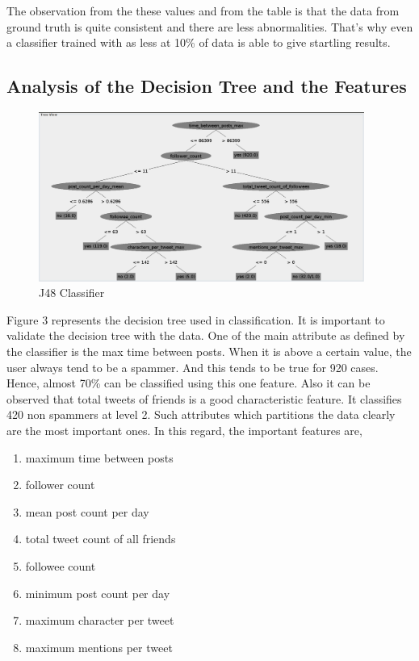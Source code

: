\documentclass[11pt]{article}
\begin{document}
\begin{enumerate}
The observation from the these values and from the table is that the data from ground truth is quite consistent and there are less abnormalities. That's why even a classifier trained with as less at 10\% of data is able to give startling results. 
\end{enumerate}

\subsection{Analysis of the Decision Tree and the Features}
\begin{figure}
\centering
\includegraphics[width=0.95\textwidth,natwidth=610,natheight=642]{classifier.pdf}
\caption{J48 Classifier}
\end{figure}

Figure 3 represents the decision tree used in classification. It is important to validate the decision tree with the data. One of the main attribute as defined by the classifier is the max time between posts. When it is above a certain value, the user always tend to be a spammer. And this tends to be true for 920 cases. Hence, almost 70\% can be classified using this one feature. Also it can be observed that total tweets of friends is a good characteristic feature. It classifies 420 non spammers at level 2. Such attributes which partitions the data clearly are the most important ones. In this regard, the important features are,
\newline
\begin{enumerate}
\item maximum time between posts %
\item follower count %
\item mean post count per day %
\item total tweet count of all friends %
\item followee count %
\item minimum post count per day %
\item maximum character per tweet %
\item maximum mentions per tweet %
\end{enumerate}
\end{document}

